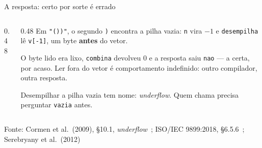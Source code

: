 \documentclass[aspectratio=169]{beamer}
\newcommand{\fonte}[1]{\vfill\hfill{\scriptsize\textcolor{UFSGray}{Fonte: #1}}}
\begin{document}
\begin{frame}{A resposta: certo por sorte é errado}
  \begin{columns}[c]
    \begin{column}{0.48\textwidth}
      \begin{center}
      \end{center}
    \end{column}
    \begin{column}{0.48\textwidth}
      \small
      Em \texttt{"())"}, o segundo \texttt{)} encontra a pilha vazia:
      \texttt{n} vira $-1$ e \texttt{desempilha} lê \texttt{v[-1]}, um byte
      \textbf{antes} do vetor.

      \medskip
      O byte lido era lixo, \texttt{combina} devolveu 0 e a resposta saiu
      \texttt{nao} --- a certa, por acaso. Ler fora do vetor é comportamento
      indefinido: outro compilador, outra resposta.

      \medskip
      Desempilhar a pilha vazia tem nome: \emph{underflow}. Quem chama
      precisa perguntar \texttt{vazia} antes.
    \end{column}
  \end{columns}
  \fonte{Cormen et al.\ (2009), §10.1, \emph{underflow}~\cite{cormen2009introduction};
    ISO/IEC 9899:2018, §6.5.6~\cite{iso2018c17}; Serebryany et al.\ (2012)~\cite{serebryany2012asan}}
\end{frame}
\end{document}

